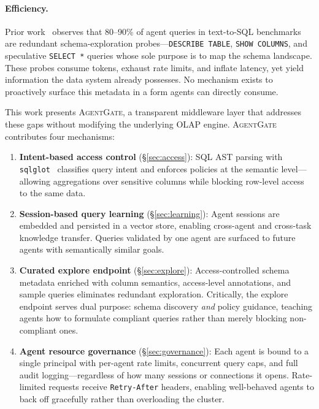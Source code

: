 \documentclass[sigconf, nonacm]{acmart}
\newcommand{\sysname}{\textsc{AgentGate}\xspace}  %
\begin{document}
\paragraph{Efficiency.}
Prior work~\cite{liu2025sao} observes that 80--90\% of agent queries in
text-to-SQL benchmarks are redundant schema-exploration
probes---\texttt{DESCRIBE TABLE}, \texttt{SHOW COLUMNS}, and speculative
\texttt{SELECT *} queries whose sole purpose is to map the schema landscape.
These probes consume tokens, exhaust rate limits, and inflate latency, yet
yield information the data system already possesses. No mechanism exists to
proactively surface this metadata in a form agents can directly consume.

\medskip
This work presents \sysname, a transparent middleware layer that addresses these
gaps without modifying the underlying OLAP engine.  \sysname contributes four
mechanisms:

\begin{enumerate}[leftmargin=*]
  \item \textbf{Intent-based access control} (\S\ref{sec:access}): SQL AST
        parsing with \texttt{sqlglot}~\cite{sqlglot2023} classifies query
        intent and enforces policies at the semantic level---allowing
        aggregations over sensitive columns while blocking row-level access
        to the same data.

  \item \textbf{Session-based query learning} (\S\ref{sec:learning}):
        Agent sessions are embedded and persisted in a vector store,
        enabling cross-agent and cross-task knowledge transfer.  Queries
        validated by one agent are surfaced to future agents with
        semantically similar goals.

  \item \textbf{Curated explore endpoint} (\S\ref{sec:explore}):
        Access-controlled schema metadata enriched with column semantics,
        access-level annotations, and sample queries eliminates redundant
        exploration.  Critically, the explore endpoint serves dual
        purpose: schema discovery \emph{and} policy guidance, teaching
        agents how to formulate compliant queries rather than merely
        blocking non-compliant ones.

  \item \textbf{Agent resource governance} (\S\ref{sec:governance}):
        Each agent is bound to a single principal with per-agent rate
        limits, concurrent query caps, and full audit logging---regardless
        of how many sessions or connections it opens.  Rate-limited
        requests receive \texttt{Retry-After} headers, enabling
        well-behaved agents to back off gracefully rather than overloading
        the cluster.
\end{enumerate}
\end{document}
